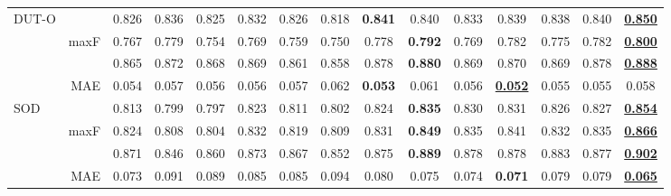 \documentclass[10pt,twocolumn,letterpaper]{article}
\def\blu#1{\textbf{\color{blue} #1}} \def\red#1{\textbf{\color{red}\underline{#1}}}
\begin{document}
\begin{table*}[t]
\begin{tabular}{lr|cccccccccccc|c}
  \multirow{4}{*}{DUT-O}
    &   &0.826 &0.836 &0.825 &0.832 &0.826 &0.818 &\blu{0.841} &0.840 &0.833 &0.839 &0.838 &0.840 &\red{0.850} \\
    & maxF  &0.767 &0.779 &0.754 &0.769 &0.759 &0.750 &0.778 &\blu{0.792} &0.769 &0.782 &0.775 &0.782 &\red{0.800}\\
    &  &0.865 &0.872 &0.868 &0.869 &0.861 &0.858 &0.878 &\blu{0.880} &0.869 &0.870 &0.869 &0.878 &\red{0.888}\\
    \cite{yang2013DUTO} & MAE &0.054 &0.057 &0.056 &0.056 &0.057 &0.062 &\blu{0.053} &0.061 &0.056 &\red{0.052} &0.055 &0.055 &0.058\\
     \hline

  \multirow{4}{*}{SOD}
    &    &0.813 &0.799 &0.797 &0.823 &0.811 &0.802 &0.824 &\blu{0.835} &0.830 &0.831 &0.826 &0.827 &\red{0.854} \\
    & maxF  &0.824 &0.808 &0.804 &0.832 &0.819 &0.809 &0.831 &\blu{0.849} &0.835 &0.841 &0.832 &0.835 &\red{0.866} \\
    &   &0.871 &0.846 &0.860 &0.873 &0.867 &0.852 &0.875 &\blu{0.889} &0.878 &0.878 &0.883 &0.877 &\red{0.902}\\
    \cite{movahedi2010SOD}& MAE  &0.073 &0.091 &0.089 &0.085 &0.085 &0.094 &0.080 &0.075 &0.074 &\blu{0.071} &0.079 &0.079 &\red{0.065}\\
     \hline

  \end{tabular}
  \label{RGB_SOTA}
\end{table*}
\end{document}
